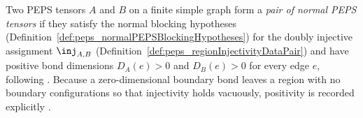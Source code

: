 \begin{definition}%
    \label{def:peps_normalPEPSPairHypotheses}
    \leanok
    Two PEPS tensors $A$ and $B$ on a finite simple graph form a
    \emph{pair of normal PEPS tensors} if they satisfy the normal blocking
    hypotheses (Definition~\ref{def:peps_normalPEPSBlockingHypotheses}) for the
    doubly injective assignment $\inj_{A,B}$
    (Definition~\ref{def:peps_regionInjectivityDataPair}) and have positive
    bond dimensions $D_A(e)>0$ and $D_B(e)>0$ for every edge $e$, following
    \cite[Section~3]{Molnar2018NormalPEPS}. Because a zero-dimensional boundary
    bond leaves a region with no boundary configurations so that injectivity
    holds vacuously, positivity is recorded explicitly
    \cite{gap:peps_injective_ft_section3_route}.
\end{definition}


